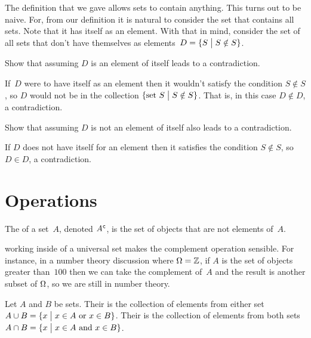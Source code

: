 \documentclass{ibl}  %
\begin{document}
\begin{problem}[\maxlength] 
The definition that we gave allows sets to contain anything.
This turns out to be naive. 
For, from our definition it is natural to consider 
the set that contains all sets.
Note that it has itself as an element.
With that in mind, 
consider the set of all sets that don't have themselves as 
elements~$D=\{S \bigm| S\notin S\}$.
\begin{exes}
\begin{exercise} 
  Show that assuming $D$ is an element of itself leads to a contradiction.
\end{exercise}
\begin{answer}
  If~$D$ were to have itself as an element 
  then it wouldn't satisfy the condition
  $S\notin S$, so $D$ would not be in the collection 
  $\{\text{set~$S$} \bigm| S\notin S\}$.
  That is, in this case $D\notin D$, a contradiction.   
\end{answer}
\begin{exercise} 
  Show that assuming $D$ is not an element of itself also leads to a
  contradiction.  
\end{exercise}
\begin{answer}
  If $D$ does not have itself for an element then it satisfies the
  condition $S\notin S$, so $D\in D$, a contradiction.  
\end{answer}
\end{exes}
\end{problem}






\section{Operations}

\begin{df}
The  of a set~$A$, denoted ${A}^{\mspace{1mu}\mathsf{c}}$, is the 
set of objects that are not elements of~$A$.  
\end{df}

\noindent\remark
working inside of a universal set makes the complement
operation sensible. 
For instance, in a number theory discussion where $\Omega=\mathbb{Z}$, 
if $A$ is the set of objects greater than~$100$ then we can
take the complement of~$A$ and the result is another subset of 
$\Omega$, so 
we are still in number theory.

\begin{df}
Let $A$ and $B$ be sets.
Their  is the collection of elements 
from either set 
$A\cup B=\{x \bigm| \text{$x\in A$ or $x\in B$}\}$.  
Their  is the collection of elements 
from both sets
$A\cap B=\{x \bigm| \text{$x\in A$ and $x\in B$}\}$.  
\end{df}
\end{document}
